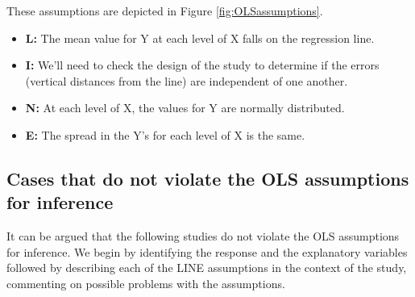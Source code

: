\documentclass[
]{krantz}
\providecommand{\tightlist}{%
  \setlength{\itemsep}{0pt}\setlength{\parskip}{0pt}}
\begin{document}
These assumptions are depicted in Figure \ref{fig:OLSassumptions}.

\begin{itemize}
\tightlist
\item
  \textbf{L:} The mean value for Y at each level of X falls on the regression line.
\item
  \textbf{I:} We'll need to check the design of the study to determine if the errors (vertical distances from the line) are independent of one another.
\item
  \textbf{N:} At each level of X, the values for Y are normally distributed.
\item
  \textbf{E:} The spread in the Y's for each level of X is the same.
\end{itemize}

\hypertarget{cases-that-do-not-violate-the-ols-assumptions-for-inference}{%
\subsection{Cases that do not violate the OLS assumptions for inference}\label{cases-that-do-not-violate-the-ols-assumptions-for-inference}}

It can be argued that the following studies do not violate the OLS assumptions for inference. We begin by identifying the response and the explanatory variables followed by describing each of the LINE assumptions in the context of the study, commenting on possible problems with the assumptions.
\end{document}
